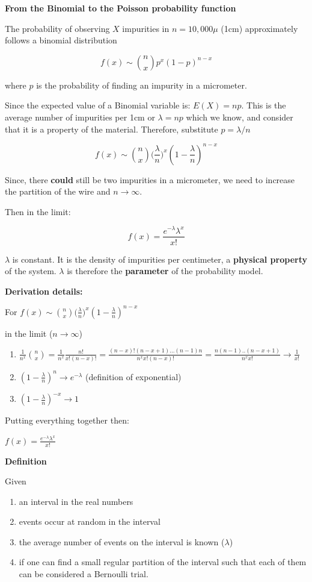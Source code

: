\documentclass[
]{book}
\providecommand{\tightlist}{%
  \setlength{\itemsep}{0pt}\setlength{\parskip}{0pt}}
\begin{document}
\textbf{From the Binomial to the Poisson probability function}

The probability of observing \(X\) impurities in \(n=10,000\mu\) (1cm) approximately follows a binomial distribution

\[f(x) \sim \binom n x p^x(1-p)^{n-x}\]

where \(p\) is the probability of finding an impurity in a micrometer.

Since the expected value of a Binomial variable is:
\(E(X)=np\). This is the average number of impurities per 1cm or \(\lambda=np\) which we know, and consider that it is a property of the material. Therefore, substitute \(p=\lambda/n\)

\[f(x) \sim \binom n x \big(\frac{\lambda}{n}\big)^x(1-\frac{\lambda}{n})^{n-x}\]

Since, there \textbf{could} still be two impurities in a micrometer, we need to increase the partition of the wire and \(n \rightarrow \infty\).

Then in the limit:

\[f(x)= \frac{e^{-\lambda}\lambda^x}{x!}\]

\(\lambda\) is constant. It is the density of impurities per centimeter, a \textbf{physical property} of the system. \(\lambda\) is therefore the \textbf{parameter} of the probability model.

\textbf{Derivation details:}

For \(f(x) \sim \binom n x \big(\frac{\lambda}{n}\big)^x(1-\frac{\lambda}{n})^{n-x}\)

in the limit (\(n \rightarrow \infty\))

\begin{enumerate}
\def\labelenumi{\arabic{enumi})}
\tightlist
\item
  \(\frac{1}{n^x}\binom n x =\frac{1}{n^x}\frac{n!}{x! (n-x)!}=\frac{(n-x)!(n-x+1)...(n-1)n}{n^x x! (n-x)!}=\frac{n(n-1)..(n-x+1)}{n^x x!} \rightarrow \frac{1}{x!}\)
\item
  \((1-\frac{\lambda}{n})^{n} \rightarrow e^{-\lambda}\) (definition of exponential)
\item
  \((1-\frac{\lambda}{n})^{-x} \rightarrow 1\)
\end{enumerate}

Putting everything together then:

\(f(x)= \frac{e^{-\lambda}\lambda^x}{x!}\)

\textbf{Definition}

Given

\begin{enumerate}
\def\labelenumi{\arabic{enumi})}
\tightlist
\item
  an interval in the real numbers
\item
  events occur at random in the interval
\item
  the average number of events on the interval is known (\(\lambda\))
\item
  if one can find a small regular partition of the interval such that each of them can be considered a Bernoulli trial.
\end{enumerate}
\end{document}
